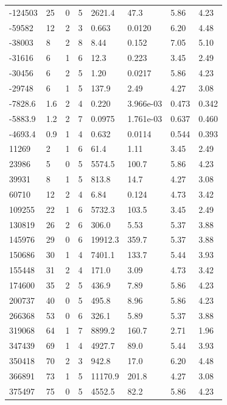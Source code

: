 \documentclass[preview]{standalone}
\begin{document}
{{\begin{tabular}{L{1.2cm}C{1.2cm} C{0.3cm}C{0.5cm} C{1.4cm}C{1.4cm} C{1.4cm}C{1.4cm}}
  -124503  &    25  & 0     &  5 &  2621.4  & 47.3  & 5.86 &  4.23   \\ 
  -59582  &    12  & 2     &  3 &  0.663  & 0.0120  & 6.20 &  4.48   \\ 
  -38003  &     8  & 2     &  8 &  8.44  & 0.152  & 7.05 &  5.10   \\ 
  -31616  &     6  & 1     &  6 &  12.3  & 0.223  & 3.45 &  2.49   \\ 
  -30456  &     6  & 2     &  5 &  1.20  & 0.0217  & 5.86 &  4.23   \\ 
  -29748  &     6  & 1     &  5 &  137.9  & 2.49  & 4.27 &  3.08   \\ 
  -7828.6  &   1.6  & 2     &  4 &  0.220  & 3.966e-03  & 0.473 &  0.342   \\ 
  -5883.9  &   1.2  & 2     &  7 &  0.0975  & 1.761e-03  & 0.637 &  0.460   \\ 
  -4693.4  &   0.9  & 1     &  4 &  0.632  & 0.0114  & 0.544 &  0.393   \\ 
  11269  &     2  & 1     &  6 &  61.4  & 1.11  & 3.45 &  2.49   \\ 
  23986  &     5  & 0     &  5 &  5574.5  & 100.7  & 5.86 &  4.23   \\ 
  39931  &     8  & 1     &  5 &  813.8  & 14.7  & 4.27 &  3.08   \\ 
  60710  &    12  & 2     &  4 &  6.84  & 0.124  & 4.73 &  3.42   \\ 
  109255  &    22  & 1     &  6 &  5732.3  & 103.5  & 3.45 &  2.49   \\ 
  130819  &    26  & 2     &  6 &  306.0  & 5.53  & 5.37 &  3.88   \\ 
  145976  &    29  & 0     &  6 &  19912.3  & 359.7  & 5.37 &  3.88   \\ 
  150686  &    30  & 1     &  4 &  7401.1  & 133.7  & 5.44 &  3.93   \\ 
  155448  &    31  & 2     &  4 &  171.0  & 3.09  & 4.73 &  3.42   \\ 
  174600  &    35  & 2     &  5 &  436.9  & 7.89  & 5.86 &  4.23   \\ 
  200737  &    40  & 0     &  5 &  495.8  & 8.96  & 5.86 &  4.23   \\ 
  266368  &    53  & 0     &  6 &  326.1  & 5.89  & 5.37 &  3.88   \\ 
  319068  &    64  & 1     &  7 &  8899.2  & 160.7  & 2.71 &  1.96   \\ 
  347439  &    69  & 1     &  4 &  4927.7  & 89.0  & 5.44 &  3.93   \\ 
  350418  &    70  & 2     &  3 &  942.8  & 17.0  & 6.20 &  4.48   \\ 
  366891  &    73  & 1     &  5 &  11170.9  & 201.8  & 4.27 &  3.08   \\ 
  375497  &    75  & 0     &  5 &  4552.5  & 82.2  & 5.86 &  4.23   \\ 
\hline 
\end{tabular} 

}}
\end{document}
